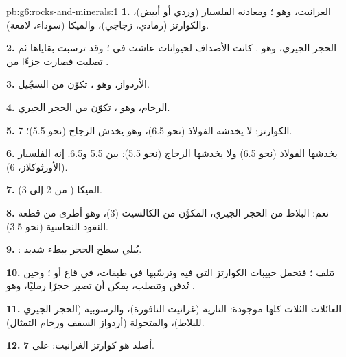 \begin{solution}{pb:g6:rocks-and-minerals:1}
\textbf{1.} الغرانيت، وهو ؛ ومعادنه الفلسبار (وردي أو
أبيض)، والكوارتز (رمادي، زجاجي)، والميكا (سوداء، لامعة).

\textbf{2.} الحجر الجيري، وهو . كانت الأصداف لحيوانات
عاشت في ؛ وقد ترسبت بقاياها ثم تصلبت فصارت جزءًا
من .

\textbf{3.} الأردواز، وهو ، تكوّن من السجّيل.

\textbf{4.} الرخام، وهو ، تكوّن من الحجر الجيري.

\textbf{5.} الكوارتز: لا يخدشه الفولاذ (نحو 6.5)، وهو يخدش الزجاج
(نحو 5.5)؛  7.

\textbf{6.} يخدشها الفولاذ (نحو 6.5) ولا يخدشها الزجاج (نحو 5.5):
 بين 5.5 و6.5. إنه الفلسبار (الأورثوكلاز، 6).

\textbf{7.} الميكا ( من 2 إلى 3).

\textbf{8.} نعم: البلاط من الحجر الجيري، المكوَّن من الكالسيت (3)، وهو أطرى من
قطعة النقود النحاسية (نحو 3.5).

\textbf{9.} :  يُبلي سطح الحجر ببطء
شديد.

\textbf{10.} تتلف  ؛ فتحمل  حبيبات الكوارتز التي فيه وترسّبها في طبقات، في قاع  أو ؛ وحين تُدفن
وتتصلب، يمكن أن تصير حجرًا رمليًا، وهو .

\textbf{11.} العائلات الثلاث كلها موجودة: النارية (غرانيت
النافورة)، والرسوبية (الحجر الجيري للبلاط)، والمتحولة (أردواز
السقف ورخام التمثال).

\textbf{12.} أصلد  هو كوارتز الغرانيت:  على 
\textbf{7}.
\end{solution}
